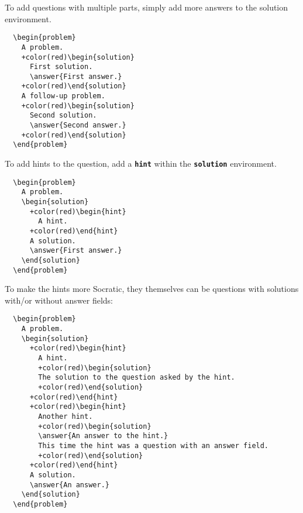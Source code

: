 \documentclass{amsart}
\newcommand\code[1]{{\bfseries\texttt{#1}}}
\begin{document}
To add questions with multiple parts, simply add more answers to the
solution environment.

\begin{Verbatim}
  \begin{problem}
    A problem. 
    +color(red)\begin{solution}
      First solution. 
      \answer{First answer.}
    +color(red)\end{solution}
    A follow-up problem.
    +color(red)\begin{solution}
      Second solution. 
      \answer{Second answer.}
    +color(red)\end{solution}
  \end{problem}
\end{Verbatim}

\break


To add hints to the question, add a \code{hint} within the
\code{solution} environment.



\begin{Verbatim}
  \begin{problem}
    A problem. 
    \begin{solution}
      +color(red)\begin{hint}
        A hint.
      +color(red)\end{hint}
      A solution. 
      \answer{First answer.}
    \end{solution}
  \end{problem}
\end{Verbatim}



To make the hints more Socratic, they themselves can be questions
with solutions with/or without answer fields:

\begin{Verbatim}
  \begin{problem}
    A problem. 
    \begin{solution}
      +color(red)\begin{hint}
        A hint.
        +color(red)\begin{solution}
        The solution to the question asked by the hint.
        +color(red)\end{solution}
      +color(red)\end{hint}
      +color(red)\begin{hint}
        Another hint.
        +color(red)\begin{solution}
        \answer{An answer to the hint.}
        This time the hint was a question with an answer field.
        +color(red)\end{solution}
      +color(red)\end{hint}
      A solution. 
      \answer{An answer.}
    \end{solution}
  \end{problem}
\end{Verbatim}
\end{document}
